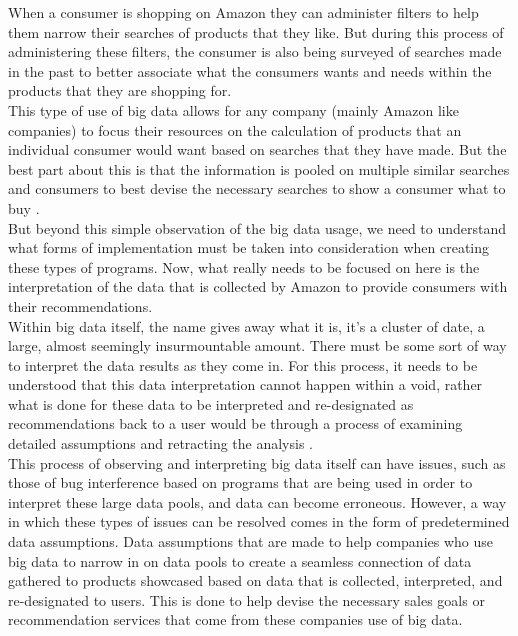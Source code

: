 \documentclass[sigconf]{acmart}
\begin{document}
When a consumer is shopping on Amazon they can administer filters to help them narrow their searches of products that they like. But during this process of administering these filters, the consumer is also being surveyed of searches made in the past to better associate what the consumers wants and needs within the products that they are shopping for.\\

This type of use of big data allows for any company (mainly Amazon like companies) to focus their resources on the calculation of products that an individual consumer would want based on searches that they have made. But the best part about this is that the information is pooled on multiple similar searches and consumers to best devise the necessary searches to show a consumer what to buy \cite{1}.\\

But beyond this simple observation of the big data usage, we need to understand what forms of implementation must be taken into consideration when creating these types of programs. Now, what really needs to be focused on here is the interpretation of the data that is collected by Amazon to provide consumers with their recommendations.\\

Within big data itself, the name gives away what it is, it’s a cluster of date, a large, almost seemingly insurmountable amount. There must be some sort of way to interpret the data results as they come in. For this process, it needs to be understood that this data interpretation cannot happen within a void, rather what is done for these data to be interpreted and re-designated as recommendations back to a user would be through a process of examining detailed assumptions and retracting the analysis \cite{2}.\\

This process of observing and interpreting big data itself can have issues, such as those of bug interference based on programs that are being used in order to interpret these large data pools, and data can become erroneous. However, a way in which these types of issues can be resolved comes in the form of predetermined data assumptions. Data assumptions that are made to help companies who use big data to narrow in on data pools to create a seamless connection of data gathered to products showcased based on data that is collected, interpreted, and re-designated to users. This is done to help devise the necessary sales goals or recommendation services that come from these companies use of big data.\\
\end{document}
